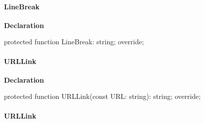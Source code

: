\documentclass{report}
\newif\ifpdf
\begin{document}
\paragraph*{LineBreak}\hspace*{\fill}

\label{PasDoc_GenHtml.TGenericHTMLDocGenerator-LineBreak}
\begin{list}{}{
\setlength{\itemindent}{0cm}
\setlength{\listparindent}{0cm}
\setlength{\leftmargin}{\evensidemargin}
\addtolength{\leftmargin}{\tmplength}
\settowidth{\labelsep}{X}
\addtolength{\leftmargin}{\labelsep}
\setlength{\labelwidth}{\tmplength}
}
\item[\textbf{Declaration}\hfill]
\ifpdf
\begin{flushleft}
\fi
\begin{ttfamily}
protected function LineBreak: string; override;\end{ttfamily}

\ifpdf
\end{flushleft}
\fi

\end{list}
\paragraph*{URLLink}\hspace*{\fill}

\label{PasDoc_GenHtml.TGenericHTMLDocGenerator-URLLink}
\begin{list}{}{
\setlength{\itemindent}{0cm}
\setlength{\listparindent}{0cm}
\setlength{\leftmargin}{\evensidemargin}
\addtolength{\leftmargin}{\tmplength}
\settowidth{\labelsep}{X}
\addtolength{\leftmargin}{\labelsep}
\setlength{\labelwidth}{\tmplength}
}
\item[\textbf{Declaration}\hfill]
\ifpdf
\begin{flushleft}
\fi
\begin{ttfamily}
protected function URLLink(const URL: string): string; override;\end{ttfamily}

\ifpdf
\end{flushleft}
\fi

\end{list}
\paragraph*{URLLink}\hspace*{\fill}
\end{document}
